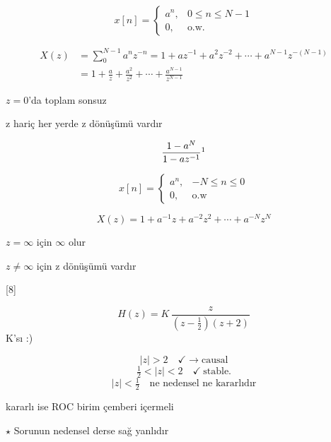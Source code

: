 \documentclass[11pt,a4paper]{article}
\begin{document}
\begin{ornek}[6]
\[ x[n] = \begin{cases} a^{n}, & 0\leq n\leq N-1 \\ 0, & \text{o.w.} \end{cases} \]
\end{ornek}

\[ \begin{aligned}
X(z) &= \sum_{0}^{N-1} a^n z^{-n} = 1 + az^{-1} + a^2 z^{-2} + \cdots + a^{N-1} z^{-(N-1)} \\
&= 1 + \frac{a}{z} + \frac{a^2}{z^2} + \cdots + \frac{a^{N-1}}{z^{N-1}}
\end{aligned} \]

$z=0$'da toplam sonsuz

z hariç her yerde z dönüşümü vardır

\[ \frac{1-a^{N}}{1-az^{-1}}\footnotemark \]

\begin{ornek}[7]
\[ x[n] = \begin{cases} a^{n}, & -N\leq n\leq 0 \\ 0, & \text{o.w} \end{cases} \]
\end{ornek}

\[ X(z) = 1 + a^{-1}z + a^{-2}z^{2} + \cdots + a^{-N}z^{N} \]

$z=\infty$ için $\infty$ olur

$z\neq\infty$ için z dönüşümü vardır

[8]

\[ H(z) = K\,\frac{z}{\left(z-\frac12\right)(z+2)} \]
 K'sı :)

\[ |z|>2 \quad \checkmark \to \text{causal} \]
\[ \tfrac12<|z|<2 \quad \checkmark\ \text{stable.} \]
\[ |z|<\tfrac12 \quad \text{ne nedensel ne kararlıdır} \]

kararlı ise ROC birim çemberi içermeli

$\star$ Sorunun  nedensel derse sağ yanlıdır
\end{document}
